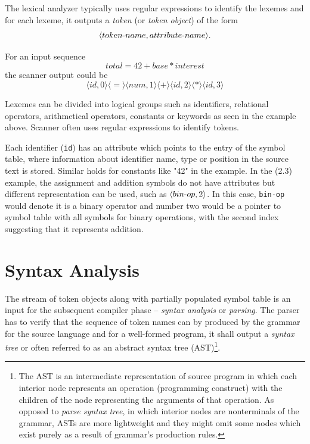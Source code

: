 \documentclass[
  digital, %
  table,   %
  lof,     %
  lot,     %
  oneside,
]{fithesis3}
\begin{document}
The lexical analyzer typically uses regular expressions to identify the lexemes and for each lexeme, it outputs a \textit{token} (or \textit{token object}) of the form 
\begin{equation}
  \langle token \textnormal{-} name, attribute \textnormal{-} name \rangle \textnormal{.}
\end{equation}

\noindent
For an input sequence 
\begin{equation}
  total = 42 + base * interest
\end{equation}
the scanner output could be
\begin{equation}
  \langle id, 0 \rangle 
  \langle = \rangle 
  \langle num, 1 \rangle 
  \langle + \rangle 
  \langle id, 2 \rangle 
  \langle * \rangle 
  \langle id, 3 \rangle
\end{equation}

Lexemes can be divided into logical groups such as identifiers, relational operators, arithmetical operators, constants or keywords as seen in the example above. Scanner often uses regular expressions to identify tokens.

Each identifier (\texttt{id}) has an attribute which points to the entry of the symbol table, where information about identifier name, type or position in the source text is stored. Similar holds for constants like "42" in the example. In the (2.3) example, the assignment and addition symbols do not have attributes but different representation can be used, such as $ \langle bin \textnormal{-} op, 2 \rangle $. In this case, \texttt{bin-op} would denote it is a binary operator and number two would be a pointer to symbol table with all symbols for binary operations, with the second index suggesting that it represents addition.

  \section{Syntax Analysis}
The stream of token objects along with partially populated symbol table is an input for the subsequent compiler phase -- \textit{syntax analysis} or \textit{parsing}. The parser has to verify that the sequence of token names can by produced by the grammar for the source language and for a well-formed program, it shall output a \textit{syntax tree} or often referred to as an abstract syntax tree (AST)\footnote{The AST is an intermediate representation of source program in which each interior node represents an operation (programming construct) with the children of the node representing the arguments of that operation. As opposed to \textit{parse syntax tree}, in which interior nodes are nonterminals of the grammar, ASTs are more lightweight and they might omit some nodes which exist purely as a result of grammar's production rules.}.
\end{document}
